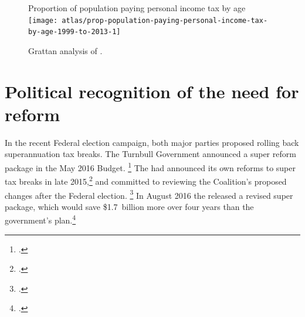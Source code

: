 \documentclass[continuous]{grattan}\usepackage[]{graphicx}\usepackage[]{color}
\newenvironment{knitrout}{}{} %
\begin{document}
\begin{figure}





{Proportion of population paying personal income tax by age}
\begin{knitrout}
\color{fgcolor}
\texttt{[image: atlas/prop-population-paying-personal-income-tax-by-age-1999-to-2013-1]} 

\end{knitrout}


%
{Grattan analysis of \textcites{ATO19992015}{ABS-2016-Resident-population-by-quarter}.}
\end{figure}



\section{Political recognition of the need for reform}\label{political-recognition-of-the-need-for-reform}

In the recent Federal election campaign, both major parties proposed rolling back superannuation tax breaks.
The Turnbull Government announced a super reform package in the May 2016 Budget.%
\footcite{Morrison-2016-A-more-sustainable-superannuation-system} The \ALP{} had announced its own reforms to super tax breaks in late 2015,\footcite{ALP2015FairerSuper} and committed to reviewing the Coalition's proposed changes after the Federal election.%
\footcite{Chalmers-Further-consultation-on-Govt-super} %
In August 2016 the \ALP{} released a revised super package, which would save \$1.7~billion more over four years than the government’s plan.\footcite{Bowen-2016-Labors-plan-for-super-not-retrospective}
\end{document}
